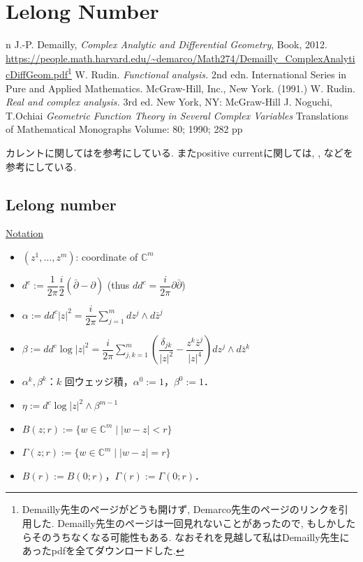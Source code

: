 \chapter{Lelong Number}

\begin{thebibliography}{n}
J.-P. Demailly,
\textit{Complex Analytic and Differential Geometry},
Book, 2012.
\url{https://people.math.harvard.edu/~demarco/Math274/Demailly_ComplexAnalyticDiffGeom.pdf}\footnote{Demailly先生のページがどうも開けず, Demarco先生のページのリンクを引用した. Demailly先生のページは一回見れないことがあったので, もしかしたらそのうちなくなる可能性もある. なおそれを見越して私はDemailly先生にあったpdfを全てダウンロードした.}
W. Rudin. \textit{Functional analysis.} 2nd edn. International Series in Pure and Applied Mathematics. McGraw-Hill, Inc., New York. (1991.)
W. Rudin. \textit{Real and complex analysis. } 3rd ed. New York, NY: McGraw-Hill 
J. Noguchi, T.Ochiai \textit{Geometric Function Theory in Several Complex Variables} Translations of Mathematical Monographs
Volume: 80; 1990; 282 pp
\end{thebibliography}
 
カレントに関しては\cite[Chapter 3]{NO}を参考にしている. 
またpositive currentに関しては, 
\cite[Chapter 1. Section 3.C]{Dem}, \cite[Chapter 3. Section 1.]{Dem}
などを参考にしている. 

\section{Lelong number}

\underline{Notation}
\begin{itemize}
\item $(z^1,\ldots,z^m)$: coordinate of $\mathbb{C}^m$
\item $d^c:=\dfrac{1}{2\pi}\dfrac{i}{2}(\bar{\partial}-\partial)$ \quad (thus $dd^c=\dfrac{i}{2\pi}\partial\bar{\partial}$)
\item $\alpha:=dd^c|z|^2=\dfrac{i}{2\pi}\displaystyle\sum_{j=1}^m dz^j\wedge d\bar{z}^j$
\item $\beta:=dd^c\log|z|^2=\dfrac{i}{2\pi}\displaystyle\sum_{j,k=1}^m\left(\dfrac{\delta_{jk}}{|z|^2}-\dfrac{z^k\bar{z}^j}{|z|^4}\right)dz^j\wedge d\bar{z}^k$
\item $\alpha^k,\beta^k$：$k$ 回ウェッジ積，$\alpha^0:=1$，$\beta^0:=1$．
\item $\eta:=d^c\log|z|^2\wedge\beta^{m-1}$
\item $B(z;r):=\{w\in\mathbb{C}^m\mid |w-z|<r\}$
\item $\Gamma(z;r):=\{w\in\mathbb{C}^m\mid |w-z|=r\}$
\item $B(r):=B(0;r)$，$\Gamma(r):=\Gamma(0;r)$．
\end{itemize}

